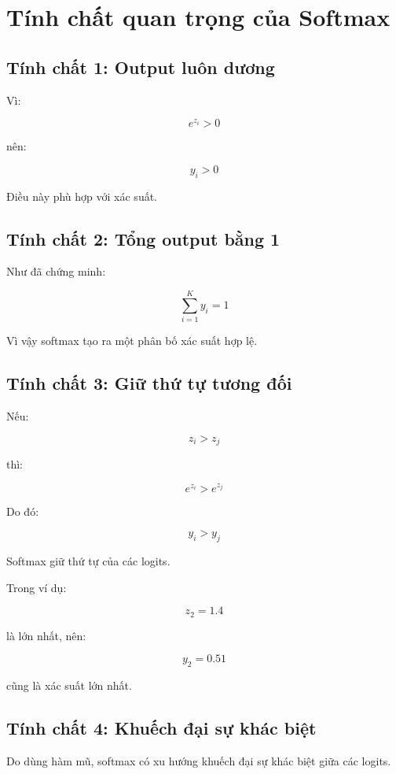 \documentclass[12pt,a4paper]{report}
\begin{document}
\chapter{Tính chất quan trọng của Softmax}

\section{Tính chất 1: Output luôn dương}

Vì:

\[
    e^{z_i}>0
\]

nên:

\[
    y_i>0
\]

Điều này phù hợp với xác suất.

\section{Tính chất 2: Tổng output bằng 1}

Như đã chứng minh:

\[
    \sum_{i=1}^{K}y_i=1
\]

Vì vậy softmax tạo ra một phân bố xác suất hợp lệ.

\section{Tính chất 3: Giữ thứ tự tương đối}

Nếu:

\[
    z_i > z_j
\]

thì:

\[
    e^{z_i} > e^{z_j}
\]

Do đó:

\[
    y_i > y_j
\]

Softmax giữ thứ tự của các logits.

\begin{vidu}
Trong ví dụ:

\[
    z_2=1.4
\]

là lớn nhất, nên:

\[
    y_2=0.51
\]

cũng là xác suất lớn nhất.
\end{vidu}

\section{Tính chất 4: Khuếch đại sự khác biệt}

Do dùng hàm mũ, softmax có xu hướng khuếch đại sự khác biệt giữa các logits.
\end{document}
